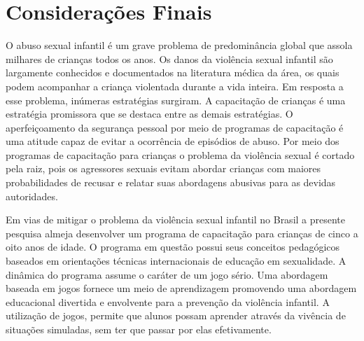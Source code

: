 \chapter{Considerações Finais}\label{ch:Conclusao}



O abuso sexual infantil é um grave problema de predominância global que assola milhares de crianças todos os anos. Os danos da violência sexual infantil são largamente conhecidos e documentados na literatura médica da área, os quais podem acompanhar a criança violentada durante a vida inteira. Em resposta a esse problema, inúmeras estratégias surgiram. A capacitação de crianças é uma estratégia promissora que se destaca entre as demais estratégias. O aperfeiçoamento da segurança pessoal por meio de programas de capacitação é uma atitude capaz de evitar a ocorrência de episódios de abuso. Por meio dos programas de capacitação para crianças o problema da violência sexual é cortado pela raiz, pois os agressores sexuais evitam abordar crianças com maiores probabilidades de recusar e relatar suas abordagens abusivas para as devidas autoridades. 

Em vias de mitigar o problema da violência sexual infantil no Brasil a presente pesquisa almeja desenvolver um programa de capacitação para crianças de cinco a oito anos de idade. O programa em questão possui seus conceitos pedagógicos baseados em orientações técnicas internacionais de educação em sexualidade. A dinâmica do programa assume o caráter de um jogo sério. Uma abordagem baseada em jogos fornece um meio de aprendizagem promovendo uma abordagem educacional divertida e envolvente para a prevenção da violência infantil. A utilização de jogos, permite que alunos possam aprender através da vivência de situações simuladas, sem ter que passar por elas efetivamente.

